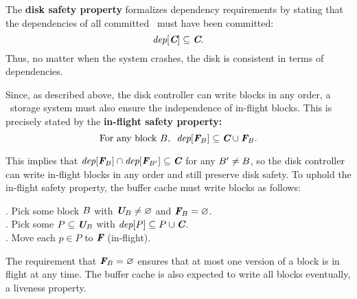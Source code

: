 The \textbf{disk safety property} formalizes dependency requirements by
 stating that the dependencies of all committed \patches\ must have been
 committed:
%
\[ \PDepset{\PDisk} \subseteq \PDisk. \]
%
Thus, no matter when the system crashes, the disk is consistent in terms of
dependencies.
%
%
\begin{comment}
 However, \Kudos\ can only control when \patches\ are handed to the disk
 controller, not when they are written to disk.
 Disk controller behavior is encapsulated in the following atomic action:

 \begin{tabbing}
 \textit{Commit block:} \\
 \quad Pick some block $b$ with $\PInf[b] \neq \emptyset$. \\
 \quad Move each $p \in \PInf[b]$ to $\PDisk$ (committed).
 \end{tabbing}
\end{comment}
%
Since, as described above, the disk controller can write blocks in any
 order, a \Kudos\ storage system must also ensure
the independence of in-flight blocks.  This is precisely stated
by the \textbf{in-flight safety property:}
%
\[ \text{For any block $\PB$,~~} \PDepset{\PInf[\PB]} \subseteq \PDisk \cup \PInf[\PB] . \]
%
\begin{comment}
(The union with $\PInf[\PB]$ is necessary for the case of multiple in-flight
\patches\ on the same block.)
\end{comment}
%
This implies that $\PDepset{\PInf[\PB]} \cap \PDepset{\PInf[\PB']} \subseteq \PDisk$ for
 any $B' \neq B$, so the disk controller can write in-flight blocks
 in any order and still preserve disk safety.
%
To uphold the in-flight safety property, the buffer cache must
 write blocks as follows:
%
\begin{tabbing}
\quad {}. Pick some block $B$ with $\PMem[\PB] \neq \emptyset$ and $\PInf[\PB] =
\emptyset$. \\
\quad {}. Pick some $P \subseteq \PMem[\PB]$ with $\PDepset{P} \subseteq P \cup
\PDisk$. \\
\quad {}. Move each $p \in P$ to $\PInf$ (in-flight).
\end{tabbing}
%
\noindent
%
The requirement that $\PInf[\PB] = \emptyset$ ensures that at most one version of
 a block is in flight at any time.
%
The buffer cache is also expected to write all blocks eventually, a
 liveness property.

